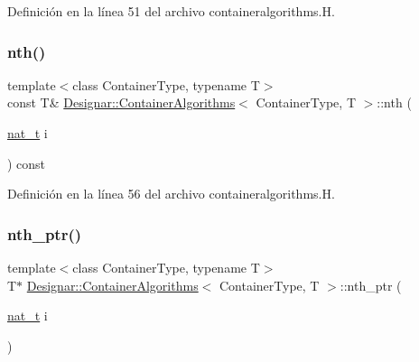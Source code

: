 Definición en la línea 51 del archivo containeralgorithms.\+H.

\mbox{\label{class_designar_1_1_container_algorithms_aaf323d0085d4be2e234049b7ea77adf9}} 
\subsubsection{\texorpdfstring{nth()}{nth()}\hspace{0.1cm}{\footnotesize\ttfamily [2/2]}}
{\footnotesize\ttfamily template$<$class Container\+Type, typename T$>$ \\
const T\& \hyperlink{class_designar_1_1_container_algorithms}{Designar\+::\+Container\+Algorithms}$<$ Container\+Type, T $>$\+::nth (\begin{DoxyParamCaption}\item[{\hyperlink{namespace_designar_aa72662848b9f4815e7bf31a7cf3e33d1}{nat\+\_\+t}}]{i }\end{DoxyParamCaption}) const\hspace{0.3cm}{\ttfamily [inline]}}



Definición en la línea 56 del archivo containeralgorithms.\+H.

\mbox{\label{class_designar_1_1_container_algorithms_ae05e29e77ab6d57f7ae5e263bec475c6}} 
\subsubsection{\texorpdfstring{nth\+\_\+ptr()}{nth\_ptr()}}
{\footnotesize\ttfamily template$<$class Container\+Type, typename T$>$ \\
T$\ast$ \hyperlink{class_designar_1_1_container_algorithms}{Designar\+::\+Container\+Algorithms}$<$ Container\+Type, T $>$\+::nth\+\_\+ptr (\begin{DoxyParamCaption}\item[{\hyperlink{namespace_designar_aa72662848b9f4815e7bf31a7cf3e33d1}{nat\+\_\+t}}]{i }\end{DoxyParamCaption})\hspace{0.3cm}{\ttfamily [inline]}}



